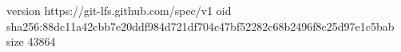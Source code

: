 version https://git-lfs.github.com/spec/v1
oid sha256:88dc11a42cbb7e20ddf984d721df704c47bf52282c68b2496f8c25d97e1c5bab
size 43864
